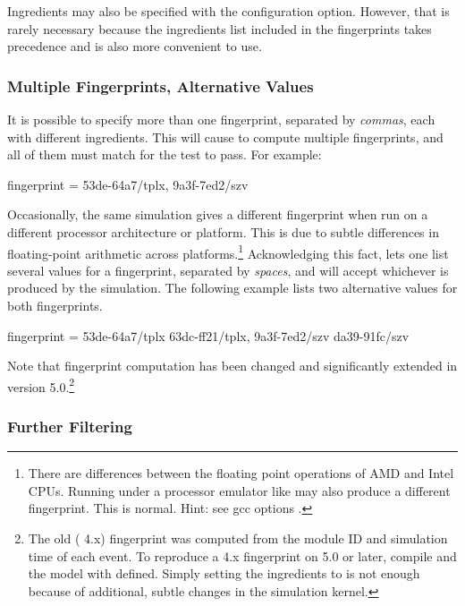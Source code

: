 Ingredients may also be specified with the
 configuration option. However, that is
rarely necessary because the ingredients list included in the fingerprints
takes precedence and is also more convenient to use.

\subsubsection{Multiple Fingerprints, Alternative Values}
\label{sec:testing:multiple-fingerprints-alternative-values}

It is possible to specify more than one fingerprint, separated by
\textit{commas}, each with different ingredients. This will cause {\opp} to
compute multiple fingerprints, and all of them must match for the test to
pass. For example:

\begin{inifile}
fingerprint = 53de-64a7/tplx, 9a3f-7ed2/szv
\end{inifile}

Occasionally, the same simulation gives a different fingerprint when run on
a different processor architecture or platform. This is due to subtle
differences in floating-point arithmetic across platforms.\footnote{There
are differences between the floating point operations of AMD and Intel
CPUs. Running under a processor emulator like  may also
produce a different fingerprint. This is normal. Hint: see gcc options
.} Acknowledging this fact, {\opp} lets one list
several values for a fingerprint, separated by \textit{spaces}, and will
accept whichever is produced by the simulation. The following example lists
two alternative values for both fingerprints.

\begin{inifile}
fingerprint = 53de-64a7/tplx 63dc-ff21/tplx, 9a3f-7ed2/szv da39-91fc/szv
\end{inifile}

Note that fingerprint computation has been changed and significantly
extended in {\opp} version 5.0.\footnote{The old ({\opp} 4.x) fingerprint
was computed from the module ID and simulation time of each event. To
reproduce a 4.x fingerprint on {\opp} 5.0 or later, compile {\opp} and the
model with  defined. Simply setting the
ingredients to  is not enough because of additional, subtle changes
in the simulation kernel.}


\subsubsection{Further Filtering}
\label{sec:testing:fingerprint-further-filtering}

